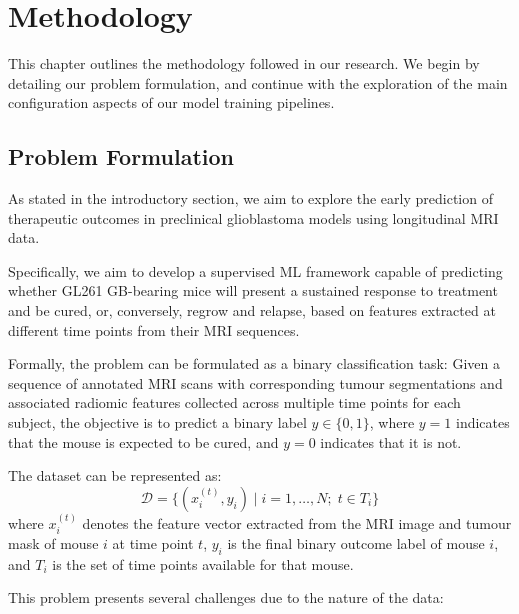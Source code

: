 \documentclass[12pt, a4paper]{report}
\begin{document}
\chapter{Methodology}
This chapter outlines the methodology followed in our research. We begin by detailing our problem formulation, and continue with the exploration of the main configuration aspects of our model training pipelines.

\section{Problem Formulation}

As stated in the introductory section, we aim to explore the early prediction of therapeutic outcomes in preclinical glioblastoma models using longitudinal MRI data.

Specifically, we aim to develop a supervised ML framework capable of predicting whether GL261 GB-bearing mice will present a sustained response to treatment and be cured, or, conversely, regrow and relapse, based on features extracted at different time points from their MRI sequences.

Formally, the problem can be formulated as a binary classification task:  
Given a sequence of annotated MRI scans with corresponding tumour segmentations and associated radiomic features collected across multiple time points for each subject, the objective is to predict a binary label $y \in \{0, 1\}$, where $y = 1$ indicates that the mouse is expected to be cured, and $y = 0$ indicates that it is not.

The dataset can be represented as:
\[
\mathcal{D} = \{(x_{i}^{(t)}, y_i) \mid i = 1, \dots, N;\; t \in T_i\}
\]
where $x_{i}^{(t)}$ denotes the feature vector extracted from the MRI image and tumour mask of mouse $i$ at time point $t$, $y_i$ is the final binary outcome label of mouse $i$, and $T_i$ is the set of time points available for that mouse.

This problem presents several challenges due to the nature of the data:
\end{document}
